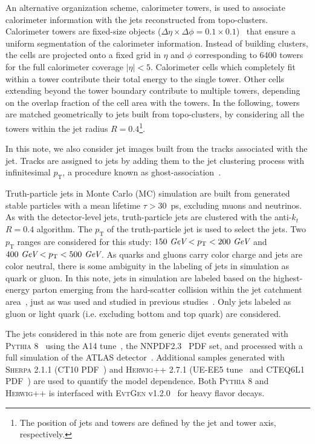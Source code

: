 An alternative organization scheme, calorimeter towers, is used to associate calorimeter information with the jets
reconstructed from topo-clusters.
Calorimeter towers are fixed-size objects ($\Delta\eta\times\Delta\phi=0.1\times0.1$)~\cite{cscbook}
that ensure a uniform segmentation of the calorimeter information.
Instead of building clusters, the cells are projected onto a fixed grid in $\eta$ and $\phi$ corresponding to 6400 towers
for the full calorimeter coverage $|\eta|<5$.
Calorimeter cells which completely fit within a tower contribute their total energy
to the single tower.
Other cells extending beyond the tower boundary contribute to multiple
towers, depending on the overlap fraction of the cell area with the towers.
In the following, towers are matched geometrically to jets built from topo-clusters, by considering all the towers within
the jet radius $R=0.4$\footnote{The position of jets and towers are defined by the jet and tower axis, respectively.}.

In this note, we also consider jet images built from the tracks associated with the jet.
Tracks are assigned to jets by adding them to the jet clustering process with infinitesimal
$p_\text{T}$, a procedure known as ghost-association~\cite{area}.  

Truth-particle jets in Monte Carlo (MC) simulation are built from generated stable particles with a mean lifetime $\tau>30$~ps, 
excluding muons and neutrinos.
As with the detector-level jets, truth-particle jets are clustered with the anti-$k_t$ $R=0.4$ algorithm.
The $p_\text{T}$ of the truth-particle jet is used to select the jets.
Two $p_\text{T}$ ranges are considered for this study: $150~\textit{GeV}<p_\text{T}<200~\textit{GeV}$ and $400~\textit{GeV}<p_\text{T}<500~\textit{GeV}$.
As quarks and gluons carry color charge and jets are color neutral, 
there is some ambiguity in the labeling of jets in simulation as quark or gluon.
In this note, jets in simulation are 
labeled based on the highest-energy parton emerging from the hard-scatter collision within the jet catchment area~\cite{area}, 
just as was used and studied in previous studies~\cite{ATL-PHYS-PUB-2017-009}.
Only jets labeled as gluon or light quark (i.e. excluding bottom and top quark) are considered.

The jets considered in this note are from generic dijet events generated with \textsc{Pythia} 8~\cite{Pythia,Pythia8} using the A14 tune~\cite{ATL-PHYS-PUB-2014-021}, the NNPDF2.3~\cite{Ball:2014uwa} PDF set, and processed with a full simulation of the ATLAS detector~\cite{Agostinelli:2002hh,Aad:2010ah}.  Additional samples generated with \textsc{Sherpa} 2.1.1 (CT10 PDF~\cite{Gao:2013xoa}) and \textsc{Herwig++} 2.7.1 (UE-EE5 tune~\cite{Seymour:2013qka} and CTEQ6L1 PDF~\cite{Stump:2003yu}) are used to quantify the model dependence.  Both \textsc{Pythia} 8 and \textsc{Herwig++} is interfaced with \textsc{EvtGen} v1.2.0~\cite{EvtGen} for heavy flavor decays.

